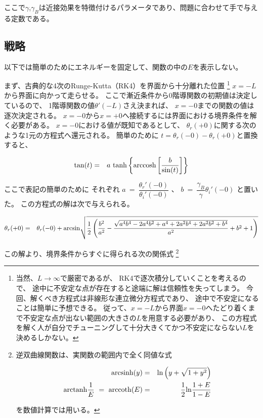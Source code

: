 \documentclass[uplatex,a4j,12pt,dvipdfmx]{jsarticle}
\begin{document}
ここで$\gamma$,$\gamma_{B}$は近接効果を特徴付けるパラメータであり、問題に合わせて手で与える定数である。

\subsection{戦略}

以下では簡単のためにエネルギーを固定して、関数の中の$E$を表示しない。

まず、古典的な4次のRunge-Kutta（RK4）を界面から十分離れた位置
\footnote{
	当然、$L \to \infty$で厳密であるが、
	RK4で逐次積分していくことを考えるので、
	途中に不安定な点が存在すると途端に解は信頼性を失ってしまう。
	今回、解くべき方程式は非線形な連立微分方程式であり、
	途中で不安定になることは簡単に予想できる。
	従って、$x=-L$から界面$x=-0$へたどり着くまで不安定な点が出ない範囲の大きさの$L$を用意する必要があり、
	この方程式を解く人が自分でチューニングして十分大きくてかつ不安定にならない$L$を決めるしかない。

}
$x=-L$
から界面に向かって走らせる。
ここで漸近条件から0階導関数の初期値は決定しているので、
1階導関数の値$\theta'(-L)$さえ決まれば、
$x=-0$までの関数の値は逐次決定される。
$x=-0$から$x=+0$へ接続するには界面における境界条件を解く必要がある。
$x=-0$における値が既知であるとして、
$\theta_{r}(+0)$に関する次のような1元の方程式へ還元される。
簡単のために
$t=\theta_{r}(-0) - \theta_{r}(+0)$と置換すると、

\begin{eqnarray}
	{\rm tan}
	(t)
	&=&
	a
	\
	{\rm tanh}
	\left\{
	{\rm arccosh}
	\left[
		\dfrac{ b }{ {\rm sin} (t) }
		\right]
	\right\}
\end{eqnarray}

ここで表記の簡単のために
それぞれ
$
	a
	\ = \
	\dfrac{ \theta_{r}'(-0) }{ \theta_{i}'(-0) }
$
、
$
	b
	\ = \
	\dfrac{ \gamma_{B} }{ \gamma }
	\theta_{i}'(-0)
$
と置いた。
この方程式の解は次で与えられる。

\begin{eqnarray}
	\theta_{r}(+0)
	&=&
	\theta_{r}(-0)
	+
	{\rm arcsin}
	\sqrt{
		\dfrac{ 1 }{ 2 }
		\left(
		\dfrac{ b^{2} }{ a^{2} }
		-
		\dfrac{ \sqrt{ a^{4} b^{4} - 2 a^{4} b^{2} + a^{4} + 2 a^{2} b^{4} + 2 a^{2} b^{2} + b^{4} } }{ a^{2} }
		+
		b^{2} + 1
		\right)
	}
	\nonumber \\
\end{eqnarray}

この解より、境界条件からすぐに得られる次の関係式
\footnote{
	逆双曲線関数は、実関数の範囲内で全く同値な式
	

	\begin{eqnarray}
		{\rm arcsinh}(y)
		&=&
		{\rm ln} \left( y + \sqrt{ 1 + y^{2} } \right)
		\\
		{\rm arctanh}\dfrac{1}{E}
		\ = \
		{\rm arccoth}(E)
		&=&
		\dfrac{1}{2}
		{\rm ln} \dfrac{1+E}{1-E}
	\end{eqnarray}
	

	を数値計算では用いる。
}
\end{document}
